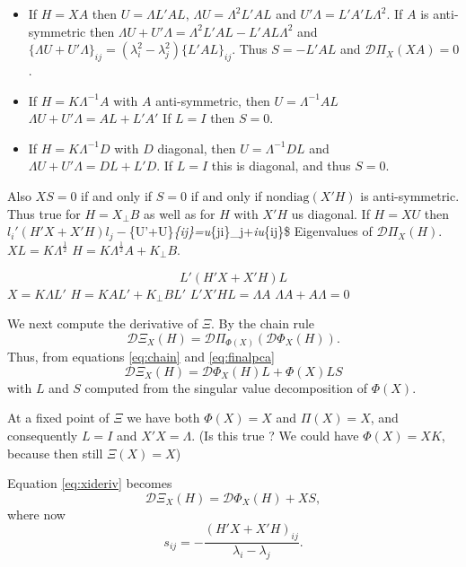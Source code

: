 \documentclass[
  12pt,
]{article}
\begin{document}
\begin{itemize}
\item
  If \(H=XA\) then \(U=\Lambda L'AL\), \(\Lambda U=\Lambda^2 L'AL\) and
  \(U'\Lambda=L'A'L\Lambda^2\). If \(A\) is anti-symmetric then
  \(\Lambda U+U'\Lambda=\Lambda^2 L'AL-L'AL\Lambda^2\)
  and \(\{\Lambda U+U'\Lambda\}_{ij}=(\lambda_i^2-\lambda_j^2)\{L'AL\}_{ij}\).
  Thus \(S=-L'AL\) and \(\mathcal{D}\Pi_X(XA)=0\).
\item
  If \(H=K\Lambda^{-1}A\) with \(A\) anti-symmetric, then
  \(U=\Lambda^{-1}AL\)
  \(\Lambda U+U'\Lambda=AL+L'A'\)
  If \(L=I\) then \(S=0\).
\item
  If \(H=K\Lambda^{-1}D\) with \(D\) diagonal, then \(U=\Lambda^{-1}DL\)
  and \(\Lambda U+U'\Lambda=DL+L'D\). If \(L=I\) this is diagonal, and
  thus \(S=0\).
\end{itemize}

Also
\(XS=0\) if and only if \(S=0\) if and only if \(\text{nondiag}(X'H)\) is
anti-symmetric. Thus true for \(H=X_\perp B\) as well as for
\(H\) with \(X'H\) us diagonal. If \(H=XU\) then \(l_i'(H'X+X'H)l_j-\)\{U'\Lambda+\Lambda U\}\emph{\{ij\}=u}\{ji\}\lambda\_j+\lambda\emph{iu}\{ij\}\$
Eigenvalues of \(\mathcal{D}\Pi_X(H)\). \(XL=K\Lambda^\frac12\) \(H=K\Lambda^\frac12 A+K_\perp B\).

\[
L'(H'X+X'H)L
\]
\(X=K\Lambda L'\) \(H=KAL'+K_\perp BL'\) \(L'X'HL=\Lambda A\) \(\Lambda A+A\Lambda=0\)

We next compute the derivative of \(\Xi\). By the chain rule
\begin{equation}
\mathcal{D}\Xi_X(H)=\mathcal{D}\Pi_{\Phi(X)}(\mathcal{D}\Phi_X(H)).
\label{eq:chain}
\end{equation}
Thus, from equations \eqref{eq:chain} and \eqref{eq:finalpca}
\begin{equation}
\mathcal{D}\Xi_X(H)=\mathcal{D}\Phi_X(H)L+\Phi(X)LS
\label{eq:xideriv}
\end{equation}
with \(L\) and \(S\) computed from the singular value decomposition of \(\Phi(X)\).

At a fixed point of \(\Xi\) we have both \(\Phi(X)=X\) and \(\Pi(X)=X\), and consequently
\(L=I\) and \(X'X=\Lambda\). (Is this true ? We could have \(\Phi(X)=XK\), because then
still \(\Xi(X)=X\))

Equation \eqref{eq:xideriv} becomes
\begin{equation}
\mathcal{D}\Xi_X(H)=\mathcal{D}\Phi_X(H)+XS,
\label{eq:xiderivfixed}
\end{equation}
where now
\begin{equation}
s_{ij}=-\frac{(H'X+X'H)_{ij}}{\lambda_i-\lambda_j}.
\label{eq:sdeffixed}
\end{equation}
\end{document}
